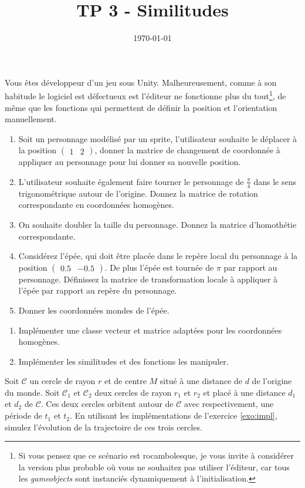 \documentclass[a4paper,12pt]{article}
\title{TP 3 - Similitudes}
\author{}
\date{\today}
\begin{document}
\makeonlytitle


\label{exo:theorique}

Vous êtes développeur d'un jeu sous Unity. Malheureusement, comme à son habitude le logiciel est défectueux est l'éditeur ne fonctionne plus du tout\footnote{Si vous pensez que ce scénario est rocambolesque, je vous invite à considérer la version plus probable où vous ne souhaitez pas utiliser l'éditeur, car tous les \textit{gameobjects} sont instanciés dynamiquement à l'initialisation.}, de même que les fonctions qui permettent de définir la position et l'orientation manuellement.  

\begin{enumerate}
  \item Soit un personnage modélisé par un sprite, l'utilisateur souhaite le déplacer à la position $\begin{pmatrix} 1 & 2\end{pmatrix}$, donner la matrice de changement de coordonnée à appliquer au personnage pour lui donner sa nouvelle position.
  \item L'utilisateur souhaite également faire tourner le personnage de \(\frac{\pi}{4}\) dans le sens trigonométrique autour de l'origine. Donnez la matrice de rotation correspondante en coordonnées homogènes.
  \item On souhaite doubler la taille du personnage. Donnez la matrice d'homothétie correspondante.
  \item Considérez l'épée, qui doit être placée dans le repère local du personnage à la position $\begin{pmatrix} 0.5 & -0.5 \end{pmatrix}$. De plus l'épée est tournée de $\pi$ par rapport au personnage. Définissez la matrice de transformation locale à appliquer à l'épée par rapport au repère du personnage.
  \item Donner les coordonnées mondes de l'épée.
\end{enumerate}

\label{exo:impl}


\begin{enumerate}
  \item Implémenter une classe vecteur et matrice adaptées pour les coordonnées homogènes.
  \item Implémenter les similitudes et des fonctions les manipuler.
\end{enumerate}


Soit $\mathcal{C}$ un cercle de rayon $r$ et de centre $M$ situé à une distance de $d$ de l'origine du monde. Soit $\mathcal{C_1}$ et $\mathcal{C_2}$ deux cercles de rayon $r_1$ et $r_2$ et placé à une distance $d_1$ et $d_2$ de $\mathcal{C}$. Ces deux cercles orbitent autour de $\mathcal{C}$ avec respectivement, une période de $t_1$ et $t_2$.
En utilisant les implémentations de l'exercice \ref{exo:impl}, simulez l'évolution de la trajectoire de ces trois cercles.
\end{document}
